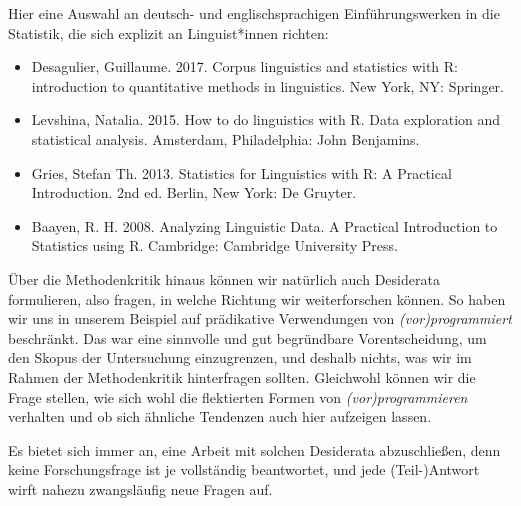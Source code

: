\documentclass[]{article}
\begin{document}
Hier eine Auswahl an deutsch- und englischsprachigen Einführungswerken
in die Statistik, die sich explizit an Linguist*innen richten:

\begin{itemize}
\item
  Desagulier, Guillaume. 2017. Corpus linguistics and statistics with R:
  introduction to quantitative methods in linguistics. New York, NY:
  Springer.
\item
  Levshina, Natalia. 2015. How to do linguistics with R. Data
  exploration and statistical analysis. Amsterdam, Philadelphia: John
  Benjamins.
\item
  Gries, Stefan Th. 2013. Statistics for Linguistics with R: A Practical
  Introduction. 2nd ed. Berlin, New York: De Gruyter.
\item
  Baayen, R. H. 2008. Analyzing Linguistic Data. A Practical
  Introduction to Statistics using R. Cambridge: Cambridge University
  Press.
\end{itemize}

Über die Methodenkritik hinaus können wir natürlich auch Desiderata
formulieren, also fragen, in welche Richtung wir weiterforschen können.
So haben wir uns in unserem Beispiel auf prädikative Verwendungen von
\emph{(vor)programmiert} beschränkt. Das war eine sinnvolle und gut
begründbare Vorentscheidung, um den Skopus der Untersuchung
einzugrenzen, und deshalb nichts, was wir im Rahmen der Methodenkritik
hinterfragen sollten. Gleichwohl können wir die Frage stellen, wie sich
wohl die flektierten Formen von \emph{(vor)programmieren} verhalten und
ob sich ähnliche Tendenzen auch hier aufzeigen lassen.

Es bietet sich immer an, eine Arbeit mit solchen Desiderata
abzuschließen, denn keine Forschungsfrage ist je vollständig
beantwortet, und jede (Teil-)Antwort wirft nahezu zwangsläufig neue
Fragen auf.
\end{document}
